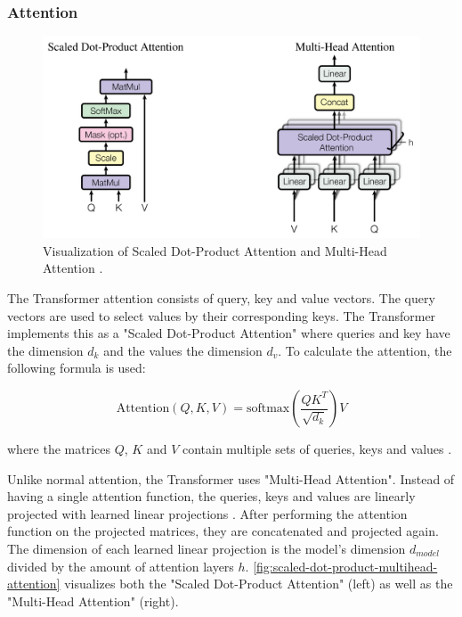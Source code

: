 \subsubsection{Attention}

\begin{figure}[h]
\centering
\includegraphics[width=0.7\paperwidth]{figures/scaled-dot-product-multihead-attention}
\caption[Visualization of Scaled Dot-Product Attention and Multi-Head Attention]{Visualization of Scaled Dot-Product Attention and Multi-Head Attention \cite[p.~4]{1706.03762}.}
\label{fig:scaled-dot-product-multihead-attention}
\end{figure}

The Transformer attention consists of query, key and value vectors.
The query vectors are used to select values by their corresponding keys.
The Transformer implements this as a "Scaled Dot-Product Attention" where queries and key have the dimension $d_k$ and the values the dimension $d_v$.
To calculate the attention, the following formula is used:


\[
	\textrm{Attention}(Q,K,V) = \textrm{softmax}(\dfrac{QK^T}{\sqrt{d_k}})V
\]

where the matrices $Q$, $K$ and $V$ contain multiple sets of queries, keys and values \cite[p.~3--4]{1706.03762}.

Unlike normal attention, the Transformer uses "Multi-Head Attention".
Instead of having a single attention function, the queries, keys and values are linearly projected with learned linear projections \cite[p.~4--5]{1706.03762}.
After performing the attention function on the projected matrices, they are concatenated and projected again.
The dimension of each learned linear projection is the model's dimension $d_{model}$ divided by the amount of attention layers $h$.
\autoref{fig:scaled-dot-product-multihead-attention} visualizes both the "Scaled Dot-Product Attention" (left) as well as the "Multi-Head Attention" (right).

